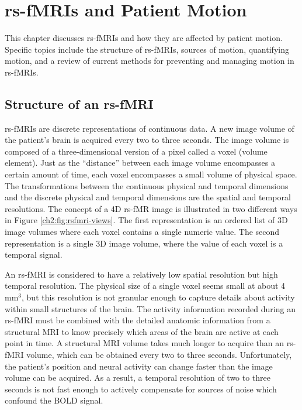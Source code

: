 \chapter{rs-fMRIs and Patient Motion}
\label{ch:mri}

This chapter discusses rs-fMRIs and how they are affected by patient motion. Specific topics include the structure of rs-fMRIs, sources of motion, quantifying motion, and a review of current methods for preventing and managing motion in rs-fMRIs.

\section{Structure of an rs-fMRI}

rs-fMRIs are discrete representations of continuous data. A new image volume of the patient's brain is acquired every two to three seconds. The image volume is composed of a three-dimensional version of a pixel called a voxel (volume element). Just as the ``distance'' between each image volume encompasses a certain amount of time, each voxel encompasses a small volume of physical space. The transformations between the continuous physical and temporal dimensions and the discrete physical and temporal dimensions are the spatial and temporal resolutions. 
The concept of a 4D rs-fMR image is illustrated in two different ways in Figure \ref{ch2:fig:rsfmri-views}. The first representation is an ordered list of 3D image volumes where each voxel contains a single numeric value. The second representation is a single 3D image volume, where the value of each voxel is a temporal signal.

An rs-fMRI is considered to have a relatively low spatial resolution but high temporal resolution. The physical size of a single voxel seems small at about 4 mm$^3$, but this resolution is not granular enough to capture details about activity within small structures of the brain. The activity information recorded during an rs-fMRI must be combined with the detailed anatomic information from a structural MRI to know precisely which areas of the brain are active at each point in time. A structural MRI volume takes much longer to acquire than an rs-fMRI volume, which can be obtained every two to three seconds. Unfortunately, the patient's position and neural activity can change faster than the image volume can be acquired. As a result, a temporal resolution of two to three seconds is not fast enough to actively compensate for sources of noise which confound the BOLD signal. 

